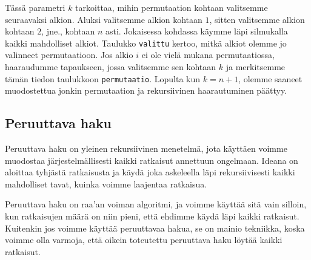 Tässä parametri $k$ tarkoittaa, mihin permutaation kohtaan
valitsemme seuraavaksi alkion.
Aluksi valitsemme alkion kohtaan $1$, sitten
valitsemme alkion kohtaan $2$, jne., kohtaan $n$ asti.
Jokaisessa kohdassa käymme läpi silmukalla kaikki mahdolliset alkiot.
Taulukko \texttt{valittu} kertoo, mitkä alkiot olemme jo valinneet
permutaatioon.
Jos alkio $i$ ei ole vielä mukana permutaatiossa, haaraudumme tapaukseen,
jossa valitsemme sen kohtaan $k$ ja merkitsemme tämän tiedon
taulukkoon \texttt{permutaatio}.
Lopulta kun $k=n+1$, olemme saaneet muodostettua jonkin permutaation
ja rekursiivinen haarautuminen päättyy.

\subsection{Peruuttava haku}

Peruuttava haku on yleinen rekursiivinen menetelmä,
jota käyttäen voimme muodostaa järjestelmällisesti
kaikki ratkaisut annettuun ongelmaan.
Ideana on aloittaa tyhjästä ratkaisusta ja käydä
joka askeleella läpi rekursiivisesti kaikki mahdolliset tavat,
kuinka voimme laajentaa ratkaisua.

Peruuttava haku on raa'an voiman algoritmi,
ja voimme käyttää sitä vain silloin,
kun ratkaisujen määrä on niin pieni,
että ehdimme käydä läpi kaikki ratkaisut.
Kuitenkin jos voimme käyttää peruuttavaa hakua,
se on mainio tekniikka,
koska voimme olla varmoja, että oikein toteutettu
peruuttava haku löytää kaikki ratkaisut.

